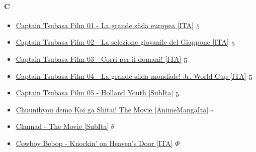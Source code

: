 		\paragraph{C} \hypertarget{FC}{}
			\begin{itemize}
				
				\item \href{https://mega.nz/#!zmYw1a4J!xgIO6jt16vG3atLrTvYw1KXubWJWGIRPsnl8EFJUGKo} {Captain Tsubasa Film 01 - La grande sfida europea [ITA]}  $\oldstylenums{5}$   \\
				\item \href{https://mega.nz/#!SrZ2hBQY!NEi8M9rL565Y4xL4Aj9svK_pdtkUPBq2VyXMVyFtU90} {Captain Tsubasa Film 02 - La selezione giovanile del Giappone [ITA]}  $\oldstylenums{5}$   \\
				\item \href{https://mega.nz/#!DjwnyILI!B5YLLoPrUiZLN6OFRLxj6nnfpjVmBhBao2gJH6Zsc7c} {Captain Tsubasa Film 03 - Corri per il domani! [ITA]}  $\oldstylenums{5}$   \\
				\item \href{https://mega.nz/#!SjwD3DDS!WqwEcQWQjXrclkIyv3yVOSuqNfXRG5h4Twj32rgC7gE} {Captain Tsubasa Film 04 - La grande sfida mondiale! Jr. World Cup [ITA]}  $\oldstylenums{5}$   \\
				\item \href{https://mega.nz/#F!X252FRSR!IjY7iYOpBPWTyyLaGPGjgA} {Captain Tsubasa Film 05 - Holland Youth [SubIta]}  $\oldstylenums{5}$   \\
				\item \href{https://mega.nz/#!W4s0lApB!roxsar_Ee6XVwylLguTX9WarIdBvK8DMsM3VEEkkxW8} {Chuunibyou demo Koi ga Shitai! The Movie [AnimeMangaIta]}  $\square$   \\
				\item \href{https://mega.nz/#!EtFnEZLA!CN6D4a9E4_qmCqwAPVuNz1TstdnwcVk8el7LcXgEV_Y} {Clannad - The Movie [SubIta]}  $\theta$   \\
				\item \href{https://mega.nz/#!5TQQgZyT!KE5SLf7XcKZ9Cxe2U1uY3OxKDqlWny5R7tJpnXh7LRA} {Cowboy Bebop - Knockin' on Heaven's Door [ITA]}  $\Phi$   \\
			
			\end{itemize}
		

